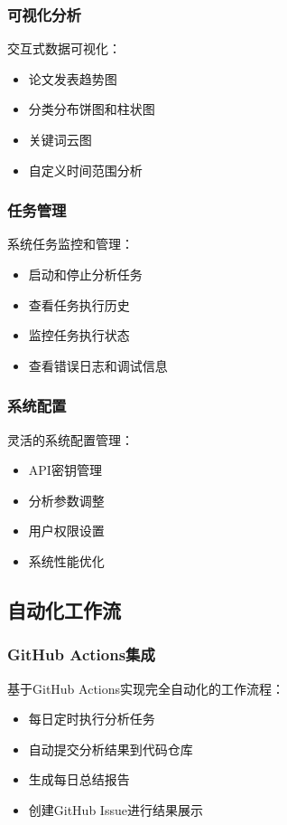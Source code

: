 \documentclass[12pt,a4paper]{article}
\begin{document}
\subsubsection{可视化分析}
交互式数据可视化：
\begin{itemize}
    \item 论文发表趋势图
    \item 分类分布饼图和柱状图
    \item 关键词云图
    \item 自定义时间范围分析
\end{itemize}

\subsubsection{任务管理}
系统任务监控和管理：
\begin{itemize}
    \item 启动和停止分析任务
    \item 查看任务执行历史
    \item 监控任务执行状态
    \item 查看错误日志和调试信息
\end{itemize}

\subsubsection{系统配置}
灵活的系统配置管理：
\begin{itemize}
    \item API密钥管理
    \item 分析参数调整
    \item 用户权限设置
    \item 系统性能优化
\end{itemize}

\subsection{自动化工作流}

\subsubsection{GitHub Actions集成}
基于GitHub Actions实现完全自动化的工作流程：
\begin{itemize}
    \item 每日定时执行分析任务
    \item 自动提交分析结果到代码仓库
    \item 生成每日总结报告
    \item 创建GitHub Issue进行结果展示
\end{itemize}
\end{document}
